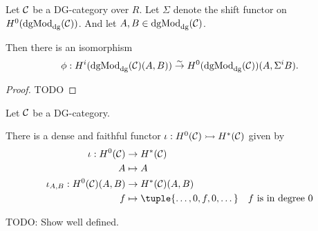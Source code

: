 
\begin{proposition}
    \label{prop:H^i_dgmod_cong_H^0_with_shift}
    Let \( {\mathcal{C}} \) be a DG-category over \( R \). Let \( \Sigma \) denote the shift functor on \( H^0(\operatorname{dgMod}_{\operatorname{dg}}({\mathcal{C}})) \). And let \( A, B \in \operatorname{dgMod}_{\operatorname{dg}}({\mathcal{C}}) \).

    Then there is an isomorphism
    \[
        \phi: H^i(\operatorname{dgMod}_{\operatorname{dg}}({\mathcal{C}})(A, B)) \stackrel{\sim}{\to} H^0(\operatorname{dgMod}_{\operatorname{dg}}({\mathcal{C}}))(A, \Sigma^i B).
    \]
\end{proposition}
\begin{proof}
    TODO
\end{proof}

\begin{remark}
    \label{rem:H^0_into_H^*_inclusion}
    Let \( {\mathcal{C}} \) be a DG-category.

    There is a dense and faithful functor \( \iota: H^0({\mathcal{C}}) \rightarrowtail H^*({\mathcal{C}}) \) given by
    \begin{align*}
        \iota: H^0(\Cc) &\to H^*(\Cc) \\
        A &\mapsto A \\
        \iota_{A, B}: H^0(\Cc)(A, B) &\to H^*(\Cc)(A, B) \\
        f &\mapsto \tuple{\dots, 0, f, 0, \dots} \quad \text{\( f \) is in degree \( 0 \)}
    \end{align*}

    TODO: Show well defined.
\end{remark}

